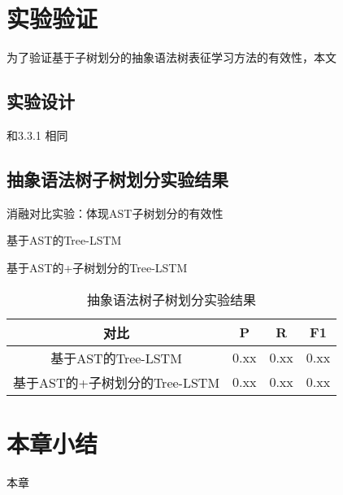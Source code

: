 \section{实验验证}
为了验证基于子树划分的抽象语法树表征学习方法的有效性，本文
\subsection{实验设计}
和3.3.1 相同
\subsection{抽象语法树子树划分实验结果}
消融对比实验：体现AST子树划分的有效性

基于AST的Tree-LSTM

基于AST的+子树划分的Tree-LSTM

\begin{table}
  \centering
  \caption{抽象语法树子树划分实验结果} \label{tab:category}
  \begin{tabular*}{0.9\textwidth}{@{\extracolsep{\fill}}cccc}
  \toprule
    对比			&P		&R		&F1 \\
  \midrule
    基于AST的Tree-LSTM			&0.xx	&0.xx		&0.xx \\
    基于AST的+子树划分的Tree-LSTM			&0.xx		&0.xx		&0.xx \\
  \bottomrule
  \end{tabular*}
\end{table}

\section{本章小结}
本章



